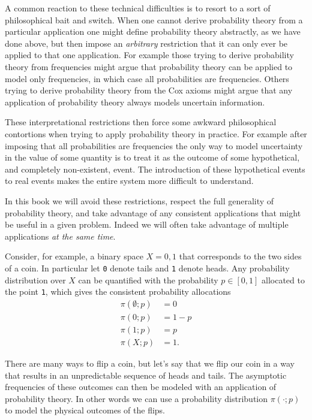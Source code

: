 \documentclass[
  letterpaper,
  DIV=11,
  numbers=noendperiod]{scrartcl}
\begin{document}
A common reaction to these technical difficulties is to resort to a sort
of philosophical bait and switch. When one cannot derive probability
theory from a particular application one might define probability theory
abstractly, as we have done above, but then impose an \emph{arbitrary}
restriction that it can only ever be applied to that one application.
For example those trying to derive probability theory from frequencies
might argue that probability theory can be applied to model only
frequencies, in which case all probabilities are frequencies. Others
trying to derive probability theory from the Cox axioms might argue that
any application of probability theory always models uncertain
information.

These interpretational restrictions then force some awkward
philosophical contortions when trying to apply probability theory in
practice. For example after imposing that all probabilities are
frequencies the only way to model uncertainty in the value of some
quantity is to treat it as the outcome of some hypothetical, and
completely non-existent, event. The introduction of these hypothetical
events to real events makes the entire system more difficult to
understand.

In this book we will avoid these restrictions, respect the full
generality of probability theory, and take advantage of any consistent
applications that might be useful in a given problem. Indeed we will
often take advantage of multiple applications \emph{at the same time}.

Consider, for example, a binary space \(X = {0, 1}\) that corresponds to
the two sides of a coin. In particular let \texttt{0} denote tails and
\texttt{1} denote heads. Any probability distribution over \(X\) can be
quantified with the probability \(p \in [0, 1]\) allocated to the point
\texttt{1}, which gives the consistent probability allocations
\begin{align*}
\pi( \emptyset; p ) &= 0
\\
\pi( {0}; p ) &= 1 - p
\\
\pi( {1}; p ) &= p
\\
\pi( X; p ) &= 1.
\end{align*}

There are many ways to flip a coin, but let's say that we flip our coin
in a way that results in an unpredictable sequence of heads and tails.
The asymptotic frequencies of these outcomes can then be modeled with an
application of probability theory. In other words we can use a
probability distribution \(\pi(\cdot; p)\) to model the physical
outcomes of the flips.
\end{document}
